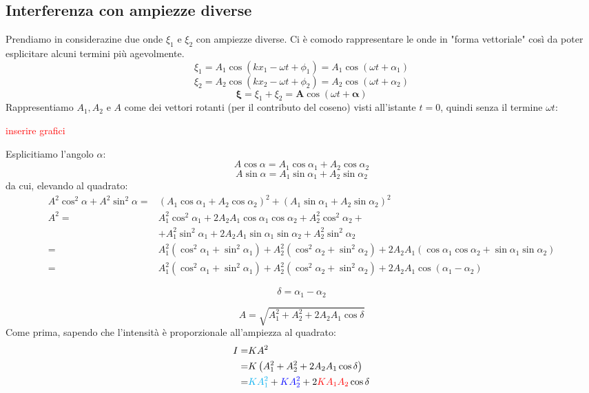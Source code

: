 \documentclass[x11names]{report}
\begin{document}
		\subsection{Interferenza con ampiezze diverse}
		Prendiamo in considerazine due onde \(\xi_1\) e \(\xi_2\) con ampiezze diverse. Ci è comodo rappresentare le onde in "forma vettoriale" così da poter esplicitare alcuni termini più agevolmente.
		\[ 
		\xi_1 = A_1 \cos\left(kx_1 - \omega t + \phi_1\right) = A_1 \cos\left(\omega t + \alpha_1\right)
		\]
		\[ 
		\xi_2 = A_2 \cos\left(kx_2 - \omega t + \phi_2\right) = A_2 \cos\left(\omega t + \alpha_2\right)
		\]
		\[ 
		\boldsymbol{\xi} = \xi _1 + \xi _2 = \boldsymbol{A}\cos\left(\omega t + \boldsymbol{\alpha}\right)
		\]
		Rappresentiamo \(A_1,A_2\) e \(A\) come dei vettori rotanti (per il contributo del coseno) visti all'istante \(t=0\), quindi senza il termine \(\omega t\):
		
		\begin{center}
			\textcolor{red}{inserire grafici}
		\end{center}
		
		Esplicitiamo l'angolo \(\alpha\):
		\[ 
		A\cos\alpha = A_1\cos\alpha_1 + A_2\cos\alpha_2		
		\]
		\[ 
		A\sin\alpha = A_1\sin\alpha_1 + A_2\sin\alpha_2		
		\]
		da cui, elevando al quadrato:
		\begin{align*} 
		A^2\cos^2\alpha + A^2\sin^2\alpha =& (A_1\cos\alpha_1 + A_2\cos\alpha_2)^2 + (A_1\sin\alpha_1 + A_2\sin\alpha_2)^2\\
									 A^2 =& A_1^2\cos^2\alpha_1 + 2A_2A_1\cos\alpha_1\cos\alpha_2 + A_2^2\cos^2\alpha_2 + \\ &+ A_1^2\sin^2\alpha_1 + 2A_2A_1\sin\alpha_1\sin\alpha_2 + A_2^2\sin^2\alpha_2\\
									     =& A_1^2(\cos^2\alpha_1 + \sin^2\alpha_1) + A_2^2(\cos^2\alpha_2 + \sin^2\alpha_2) + 2A_2A_1(\cos\alpha_1\cos\alpha_2 + \sin\alpha_1\sin\alpha_2)\\
									     =&  A_1^2(\cos^2\alpha_1 + \sin^2\alpha_1) + A_2^2(\cos^2\alpha_2 + \sin^2\alpha_2) +  2A_2A_1\cos\left(\alpha_1 - \alpha_2\right)
		\end{align*} 
		
		\[ 
		\boxed{\delta = \alpha_1 - \alpha_2}
		\]
		
		\begin{equation}
			A = \sqrt{A_1^2 + A_2^2 + 2A_2A_1\cos\delta}
		\end{equation}
		Come prima, sapendo che l'intensità è proporzionale all'ampiezza al quadrato:
		\begin{align*}
		I =& KA^2 \\ 
		  =& K\left(A_1^2 + A_2^2 + 2A_2A_1\cos\delta\right)\\
		  =& \textcolor{cyan}{KA_1^2} + \textcolor{blue}{KA_2^2} + 2\textcolor{red}{KA_1A_2}\cos\delta
		\end{align*}
		
\end{document}
